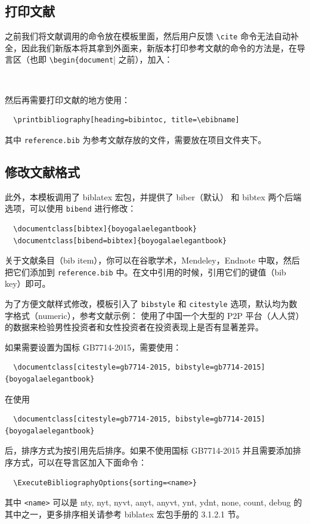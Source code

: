 \documentclass[lang=cn,10pt,scheme=chinese]{boyogalaelegantbook}
\begin{document}
\subsection{打印文献}

之前我们将文献调用的命令放在模板里面，然后用户反馈 \lstinline{\cite} 命令无法自动补全，因此我们新版本将其拿到外面来，新版本打印参考文献的命令的方法是，在导言区（也即 \lstinline|\begin{document|| 之前），加入：

\begin{lstlisting}
  
\end{lstlisting}

然后再需要打印文献的地方使用：
\begin{lstlisting}
  \printbibliography[heading=bibintoc, title=\ebibname]
\end{lstlisting}

其中 \lstinline{reference.bib} 为参考文献存放的文件，需要放在项目文件夹下。

\subsection{修改文献格式}

此外，本模板调用了 biblatex 宏包，并提供了 biber（默认） 和 bibtex 两个后端选项，可以使用 \lstinline{bibend} 进行修改：

\begin{lstlisting}
  \documentclass[bibtex]{boyogalaelegantbook}
  \documentclass[bibend=bibtex]{boyogalaelegantbook}
\end{lstlisting}

关于文献条目（bib item），你可以在谷歌学术，Mendeley，Endnote 中取，然后把它们添加到 \lstinline{reference.bib} 中。在文中引用的时候，引用它们的键值（bib key）即可。

为了方便文献样式修改，模板引入了 \lstinline{bibstyle} 和 \lstinline{citestyle} 选项，默认均为数字格式（numeric），参考文献示例：\cite{cn1,en2,en3} 使用了中国一个大型的 P2P 平台（人人贷）的数据来检验男性投资者和女性投资者在投资表现上是否有显著差异。

如果需要设置为国标 GB7714-2015，需要使用：
\begin{lstlisting}
  \documentclass[citestyle=gb7714-2015, bibstyle=gb7714-2015]{boyogalaelegantbook} 
\end{lstlisting}

在使用
\begin{lstlisting}
  \documentclass[citestyle=gb7714-2015, bibstyle=gb7714-2015]{boyogalaelegantbook} 
\end{lstlisting}
后，排序方式为按引用先后排序。如果不使用国标 GB7714-2015 并且需要添加排序方式，可以在导言区加入下面命令：
\begin{lstlisting}
  \ExecuteBibliographyOptions{sorting=<name>}
\end{lstlisting}
其中 \lstinline{<name>} 可以是 nty, nyt, nyvt, anyt, anyvt, ynt, ydnt, none, count, debug 的其中之一，更多排序相关请参考 biblatex 宏包手册的 3.1.2.1 节。
\end{document}
